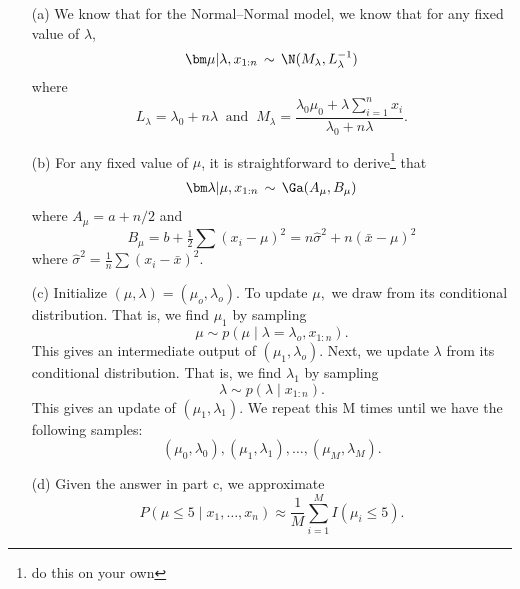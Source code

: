 \documentclass[12pt]{article}
\begin{document}
\begin{enumerate}
\item[(a)] We know that for the Normal--Normal model, we know that for any fixed value of $\lambda$,
$$\bm\mu|\lambda,x_{1:n}\, \sim \,\N(M_\lambda,L_\lambda^{-1})$$
 where $$L_\lambda =\lambda_0+ n\lambda \;\;  \text{and} \;\;
 M_\lambda =\frac{\lambda_0\mu_0+\lambda\sum_{i = 1}^n x_i}{\lambda_0+ n\lambda}.$$
\item[(b)] For any fixed value of $\mu$, it is straightforward to derive\footnote{do this on your own} that
\begin{align}\label{equation:lambda-semi-conjugate}
\bm\lambda|\mu, x_{1:n}\,\sim\,\Ga(A_\mu, B_\mu)
\end{align}
where $A_\mu = a + n/2$ and
$$ B_\mu = b +\tfrac{1}{2}\textstyle\sum (x_i -\mu)^2 = n\hat\sigma^2 + n (\bar x-\mu)^2$$
where $\hat\sigma^2 = \frac{1}{n}\sum (x_i -\bar x)^2$. 
\item[(c)] Initialize $(\mu, \lambda) = (\mu_o, \lambda_o).$ To update $\mu,$ we draw from its conditional distribution. That is, we find $\mu_1$ by sampling $$\mu \sim p(\mu \mid \lambda=\lambda_o, x_{1:n}).$$ This gives an intermediate output of $(\mu_1, \lambda_o).$ Next, we update $\lambda$ from its conditional distribution. That is, we find $\lambda_1$ by sampling $$\lambda \sim p(\lambda \mid x_{1:n}).$$ This gives an update of $(\mu_1, \lambda_1).$ We repeat this M times until we have the following samples: $$(\mu_0, \lambda_0), (\mu_1, \lambda_1), \ldots, (\mu_M, \lambda_M).$$
\item[(d)] Given the answer in part c, we approximate $$P(\mu \leq 5 \mid x_1, \ldots, x_n) \approx \frac{1}{M}\sum_{i=1}^{M} I(\mu_i \leq 5).$$

\end{enumerate}
\end{document}
